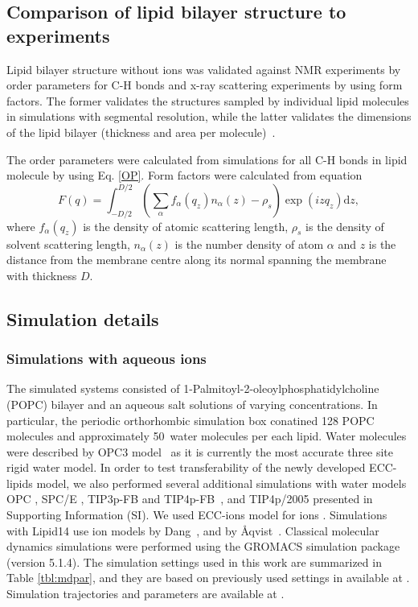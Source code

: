 \documentclass[aip,jcp,twocolumn]{revtex4}
\begin{document}
\subsection{Comparison of lipid bilayer structure to experiments}

Lipid bilayer structure without ions was validated against NMR experiments
by order parameters for C-H bonds and \mbox{x-ray} scattering experiments by using
form factors. The former validates the structures sampled by individual
lipid molecules in simulations with segmental resolution, while the latter
validates the dimensions of the lipid bilayer (thickness and area per
molecule)~\cite{ollila16}.

The order parameters were calculated from simulations for all C-H bonds
in lipid molecule by using Eq. \ref{OP}. Form factors were calculated 
from equation
\begin{equation}
  F(q) = \int _{-D/2} ^{D/2} \left ( \sum _\alpha f_\alpha (q_z) n_\alpha (z) - \rho _s \right ) \exp (izq_z) \mathrm{d}z,
\end{equation}
where $f_\alpha(q_z)$ is the density of atomic scattering length, 
$\rho_s$ is the density of solvent scattering length,
$n_\alpha (z)$ is the number density of atom $\alpha$ and
$z$ is the distance from the membrane centre along its normal 
spanning the membrane with thickness $D$. 




\subsection{Simulation details}

\subsubsection{Simulations with aqueous ions}
The simulated systems consisted of 1-Palmitoyl-2-oleoylphosphatidylcholine
(POPC) bilayer and an aqueous salt solutions of varying concentrations.
In particular, the periodic orthorhombic simulation box conatined 
128 POPC molecules and approximately 50~water molecules per each lipid.
Water molecules were described by OPC3 model~\cite{Izadi16} 
as it is currently the most accurate three site rigid water model. 
In order to test transferability of the newly developed ECC-lipids model, 
we also performed several additional simulations with water models 
OPC \cite{Izadi14}, SPC/E \cite{Berendsen1987}, TIP3p-FB and TIP4p-FB~\cite{Wang2014}, and TIP4p/2005 \cite{Abascal2005}
presented in Supporting Information (SI). 
We used ECC-ions model for ions \cite{jungwirth17-new-paper-to-be-published, kohagen16, Pluharova2014}.  %
Simulations with Lipid14 use ion models by Dang~\cite{smith94,chang1999,dang2006}, and by \AA{}qvist~\cite{aqvist90}. 
Classical molecular dynamics simulations were performed using the GROMACS \cite{Abraham15} simulation package (version 5.1.4).  
The simulation settings used in this work are 
summarized in Table \ref{tbl:mdpar}, 
and they are based on previously used settings in \cite{catte16} available at \cite{lipid14POPC0mMNaClfiles}. 
Simulation trajectories and parameters are available at \cite{??} . 
\end{document}
